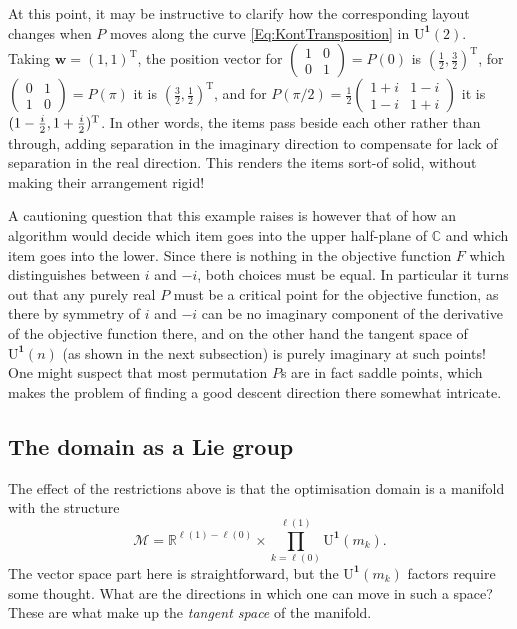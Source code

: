 \documentclass{article}
\newcommand{\C}{\mathbb{C}}
\newcommand{\R}{\mathbb{R}}
\newcommand{\transpose}[1]{#1^{\mathrm{T}}}
\newcommand{\mc}{\mathcal}
\newcommand{\vek}{\mathbf}
\newcommand{\UOne}{\mathrm{U}^{\vek{1}}}
\theoremstyle{definition}
\begin{document}
At this point, it may be instructive to clarify how the corresponding 
layout changes when $P$ moves along the curve 
\eqref{Eq:KontTransposition} in $\UOne(2)$. Taking \(\vek{w} = 
\transpose{(1,1)}\), the position vector for \(\left( \begin{smallmatrix} 
1&0 \\ 0&1 \end{smallmatrix} \right) = P(0)\) is 
$\transpose{(\frac{1}{2}, \frac{3}{2})}$, for \(\left( \begin{smallmatrix} 
0&1 \\ 1&0 \end{smallmatrix} \right) = P(\pi)\) it is 
$\transpose{(\frac{3}{2}, \frac{1}{2})}$, and for \(P(\pi/2) = 
\frac{1}{2} \left( \begin{smallmatrix} 1+i& 1-i \\ 1-i& 1+i 
\end{smallmatrix} \right)\) it is $\transpose{( 1 -\nobreak 
\frac{i}{2}, 1 +\nobreak \frac{i}{2} )}$. In other words, the items 
pass beside each other rather than through, adding separation in the 
imaginary direction to compensate for lack of separation in the real 
direction. This renders the items sort-of solid, without making their 
arrangement rigid!

A cautioning question that this example raises is however that of how 
an algorithm would decide which item goes into the upper half-plane 
of $\C$ and which item goes into the lower. Since there is nothing in 
the objective function $F$ which distinguishes between $i$ and $-i$, 
both choices must be equal. In particular it turns out that any purely 
real $P$ must be a critical point for the objective function, as there 
by symmetry of $i$ and $-i$ can be no imaginary component of the 
derivative of the objective function there, and on the other hand the 
tangent space of $\UOne(n)$ (as shown in the next subsection) is 
purely imaginary at such points! One might suspect that most 
permutation $P$s are in fact saddle points, which makes the problem 
of finding a good descent direction there somewhat intricate.




\subsection{The domain as a Lie group}

The effect of the restrictions above is that the optimisation domain 
is a manifold with the structure
\begin{equation}
  \mc{M} = 
  \R^{\ell(1)-\ell(0)} \times \prod_{k=\ell(0)}^{\ell(1)} \UOne(m_k)
  \text{.}
\end{equation}
The vector space part here is straightforward, but the $\UOne(m_k)$ 
factors require some thought. What are the directions in which one 
can move in such a space? These are what make up the \emph{tangent 
space} of the manifold.
\end{document}
